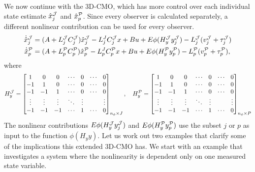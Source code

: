 We now continue with the 3D-CMO, which has more control over each individual state estimate $\hat{x}^{\mathcal{J}}_{j}$ and $\hat{x}^{\mathcal{P}}_p$. Since every observer is calculated separately, a different nonlinear contribution can be used for every observer.
\begin{equation}\label{eqn:ext-NL-observer}
    \begin{split}
        \dot{\hat{x}}_{j}^{\mathcal{J}} &= (A + L_{j}^{\mathcal{J}}C_{j}^{\mathcal{J}})\hat{x}^{\mathcal{J}}_{j} - L_{j}^JC_{j}^{\mathcal{J}}x + Bu + E\phi(H^{\mathcal{J}}_yy^{\mathcal{J}}_{j}) - L_{j}^{\mathcal{J}}(v_{j}^{\mathcal{J}} + \tau_{j}^{\mathcal{J}}) \\
        \dot{\hat{x}}_{p}^{\mathcal{P}} &= (A + L_{p}^{\mathcal{P}}C_{p}^{\mathcal{P}})\hat{x}^{\mathcal{P}}_{p} - L_{p}^JC_{p}^{\mathcal{P}}x + Bu + E\phi(H^{\mathcal{P}}_yy^{\mathcal{P}}_{p}) - L_{p}^{\mathcal{P}}(v_{p}^{\mathcal{P}} + \tau_{p}^{\mathcal{P}}),
    \end{split}
\end{equation}
where
\begin{equation*}
    H^{\mathcal{J}}_y = 
    \begin{bmatrix}
        1 & 0 & 0 & \cdots & 0 & \cdots & 0 \\
        -1 & 1 & 0 & \cdots & 0 & \cdots & 0 \\
        -1 & -1 & 1 & \cdots & 0 & \cdots & 0 \\
        \vdots & \vdots & \vdots & \ddots & \vdots &  & \vdots \\
        -1 & -1 & -1 & \cdots & 1 & \cdots & 0 \\
    \end{bmatrix}_{n_{\phi} \times J}, \quad
    H^{\mathcal{P}}_y = 
    \begin{bmatrix}
        1 & 0 & 0 & \cdots & 0 & \cdots & 0 \\
        -1 & 1 & 0 & \cdots & 0 & \cdots & 0 \\
        -1 & -1 & 1 & \cdots & 0 & \cdots & 0 \\
        \vdots & \vdots & \vdots & \ddots & \vdots &  & \vdots \\
        -1 & -1 & -1 & \cdots & 1 & \cdots & 0 \\
    \end{bmatrix}_{n_\phi \times P}
\end{equation*}
The nonlinear contributions $E\phi(H^{\mathcal{J}}_yy^{\mathcal{J}}_{j})$ and $E\phi(H^{\mathcal{P}}_yy^{\mathcal{P}}_{p})$ use the subset $j$ or $p$ as input to the function $\phi(H_yy)$. Let us work out two examples that clarify some of the implications this extended 3D-CMO has. We start with an example that investigates a system where the nonlinearity is dependent only on one measured state variable.

